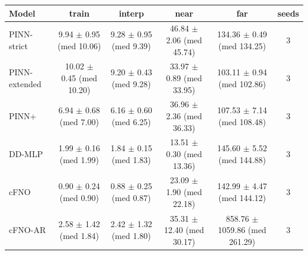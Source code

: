 \begin{tabular}{lccccc}
\toprule
Model & train & interp & near & far & seeds \\
\midrule
PINN-strict & 9.94 $\pm$ 0.95 (med 10.06) & 9.28 $\pm$ 0.95 (med 9.39) & 46.84 $\pm$ 2.06 (med 45.74) & 134.36 $\pm$ 0.49 (med 134.25) & 3 \\
PINN-extended & 10.02 $\pm$ 0.45 (med 10.20) & 9.20 $\pm$ 0.43 (med 9.28) & 33.97 $\pm$ 0.89 (med 33.95) & 103.11 $\pm$ 0.94 (med 102.86) & 3 \\
PINN+ & 6.94 $\pm$ 0.68 (med 7.00) & 6.16 $\pm$ 0.60 (med 6.25) & 36.96 $\pm$ 2.36 (med 36.33) & 107.53 $\pm$ 7.14 (med 108.48) & 3 \\
DD-MLP & 1.99 $\pm$ 0.16 (med 1.99) & 1.84 $\pm$ 0.15 (med 1.83) & 13.51 $\pm$ 0.30 (med 13.36) & 145.60 $\pm$ 5.52 (med 144.88) & 3 \\
cFNO & 0.90 $\pm$ 0.24 (med 0.90) & 0.88 $\pm$ 0.25 (med 0.87) & 23.09 $\pm$ 1.90 (med 22.18) & 142.99 $\pm$ 4.47 (med 144.12) & 3 \\
cFNO-AR & 2.58 $\pm$ 1.42 (med 1.84) & 2.42 $\pm$ 1.32 (med 1.80) & 35.31 $\pm$ 12.40 (med 30.17) & 858.76 $\pm$ 1059.86 (med 261.29) & 3 \\
\bottomrule
\end{tabular}
